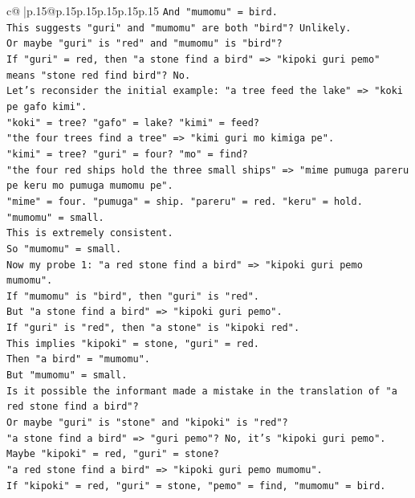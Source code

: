 \documentclass{article}
\begin{document}
{\begin{supertabular}{c@{$\;$}|p{.15\linewidth}@{}p{.15\linewidth}p{.15\linewidth}p{.15\linewidth}p{.15\linewidth}p{.15\linewidth}}
{{{\texttt{And "mumomu" = bird.} \\
\texttt{This suggests "guri" and "mumomu" are both "bird"? Unlikely.} \\
\texttt{Or maybe "guri" is "red" and "mumomu" is "bird"?} \\
\texttt{If "guri" = red, then "a stone find a bird" => "kipoki guri pemo" means "stone red find bird"? No.} \\
\texttt{Let's reconsider the initial example: "a tree feed the lake" => "koki pe gafo kimi".} \\
\texttt{"koki" = tree? "gafo" = lake? "kimi" = feed?} \\
\texttt{"the four trees find a tree" => "kimi guri mo kimiga pe".} \\
\texttt{"kimi" = tree? "guri" = four? "mo" = find?} \\
\texttt{"the four red ships hold the three small ships" => "mime pumuga pareru pe keru mo pumuga mumomu pe".} \\
\texttt{"mime" = four. "pumuga" = ship. "pareru" = red. "keru" = hold. "mumomu" = small.} \\
\texttt{This is extremely consistent.} \\
\texttt{So "mumomu" = small.} \\
\texttt{Now my probe 1: "a red stone find a bird" => "kipoki guri pemo mumomu".} \\
\texttt{If "mumomu" is "bird", then "guri" is "red".} \\
\texttt{But "a stone find a bird" => "kipoki guri pemo".} \\
\texttt{If "guri" is "red", then "a stone" is "kipoki red".} \\
\texttt{This implies "kipoki" = stone, "guri" = red.} \\
\texttt{Then "a bird" = "mumomu".} \\
\texttt{But "mumomu" = small.} \\
\texttt{Is it possible the informant made a mistake in the translation of "a red stone find a bird"?} \\
\texttt{Or maybe "guri" is "stone" and "kipoki" is "red"?} \\
\texttt{"a stone find a bird" => "guri pemo"? No, it's "kipoki guri pemo".} \\
\texttt{Maybe "kipoki" = red, "guri" = stone?} \\
\texttt{"a red stone find a bird" => "kipoki guri pemo mumomu".} \\
\texttt{If "kipoki" = red, "guri" = stone, "pemo" = find, "mumomu" = bird.} \\
}}}
\end{supertabular}}
\end{document}
